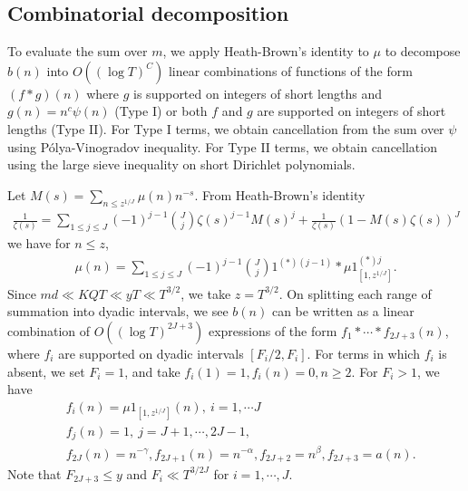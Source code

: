 \documentclass[oneside, 12pt]{amsart}
\theoremstyle{definition}
\renewcommand{\pmod}[1]{\,(\textup{mod}\,#1)}
\begin{document}
\subsection{Combinatorial decomposition}	
To evaluate the sum over $m$, we apply Heath-Brown's identity to $\mu$ to decompose $b(n)$ into $O((\log T)^C)$ linear combinations of functions of the form $(f*g)(n)$ where $g$ is supported on integers of short lengths and $g(n)=n^c \psi(n)$ (Type I) or both $f$ and $g$ are supported on integers of short lengths (Type II). For Type I terms, we obtain cancellation from the sum over $\psi$ using P\'olya-Vinogradov inequality. For Type II terms, we obtain cancellation using the large sieve inequality on short Dirichlet polynomials. 

	Let $M(s)=\sum_{n\leq z^{1/J}}\mu(n)n^{-s}$. From Heath-Brown's identity
	\begin{align*}
	\frac{1}{\zeta(s)}=\sum_{1\leq j \leq J} (-1)^{j-1}\binom{J}{j}\zeta(s)^{j-1}M(s)^{j}+ \frac{1}{\zeta(s)}\left(1-M(s)\zeta(s)\right)^J
	\end{align*} 
	we have for $n\leq z$, 
	\begin{align}\label{HeathBrownMu}
	\mu(n)=\sum_{1\leq j\leq J}(-1)^{j-1}\binom{J}{j}1^{(*)(j-1)}*\mu 1_{[1, z^{1/J}]}^{(*)j}.
	\end{align}
	Since $md\ll KQT\ll y T\ll T^{3/2}$, we take $z=T^{3/2}$. 
On splitting each range of summation into dyadic intervals, we see $b(n)$ can be written as a linear combination of $O((\log T)^ {2J+3})$ expressions of the form $f_1*\cdots * f_{2J+3}(n)$, where $f_i$ are supported on dyadic intervals $[F_i/2, F_i]$. For terms in which $f_i$ is absent, we set $F_i=1$, and take $f_i(1)=1, f_i(n)=0, n\geq 2$. For $F_i>1$, we have 
\begin{align*}
&f_i(n)=\mu 1_{[1,z^{1/J}]}(n), \ i=1, \cdots J\\
&f_j(n)=1, \ j=J+1, \cdots, 2J-1, \\
&f_{2J}(n)=n^{-\gamma}, f_{2J+1}(n)=n^{-\alpha}, f_{2J+2}=n^{\beta}, f_{2J+3}=a(n).
\end{align*}
Note that $F_{2J+3}\leq y$ and $F_i \ll T^{3/2J}$ for $i=1, \cdots, J$. 
\end{document}
